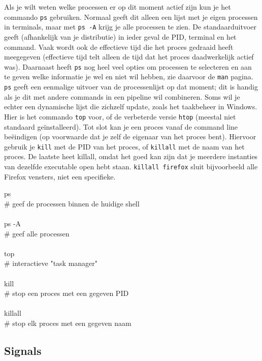 Als je wilt weten welke processen er op dit moment actief zijn kun je het commando \texttt{ps} gebruiken. Normaal geeft dit alleen een lijst met je eigen processen in terminals, maar met \texttt{ps\ -A} krijg je alle processen te zien. De standaarduitvoer geeft (afhankelijk van je distributie) in ieder geval de PID, terminal en het command. Vaak wordt ook de effectieve tijd die het proces gedraaid heeft meegegeven (effectieve tijd telt alleen de tijd dat het proces daadwerkelijk actief was). Daarnaast heeft \texttt{ps} nog heel veel opties om processen te selecteren en aan te geven welke informatie je wel en niet wil hebben, zie daarvoor de \texttt{man} pagina. \texttt{ps} geeft een eenmalige uitvoer van de processenlijst op dat moment; dit is handig als je dit met andere commands in een pipeline wil combineren. Soms wil je echter een dynamische lijst die zichzelf update, zoals het taakbeheer in Windows. Hier is het commando \texttt{top} voor, of de verbeterde versie \texttt{htop} (meestal niet standaard geïnstalleerd). Tot slot kan je een proces vanaf de command line beëindigen (op voorwaarde dat je zelf de eigenaar van het proces bent). Hiervoor gebruik je \texttt{kill} met de PID van het proces, of \texttt{killall} met de naam van het proces. De laatste heet killall, omdat het goed kan zijn dat je meerdere instanties van dezelfde executable open hebt staan. \texttt{killall\ firefox} sluit bijvoorbeeld alle Firefox vensters, niet een specifieke.

\begin{bash}
\p[~] ps\\
\# geef de processen binnen de huidige shell\\
\\
\p[~] ps -A\\
\# geef alle processen\\
\\
\p[~] top\\
\# interactieve "task manager"\\
\\
\p[~] kill\\
\# stop een proces met een gegeven PID\\
\\
\p[~] killall\\
\# stop elk proces met een gegeven naam\\
\end{bash}

\subsection{Signals}\label{signals}

